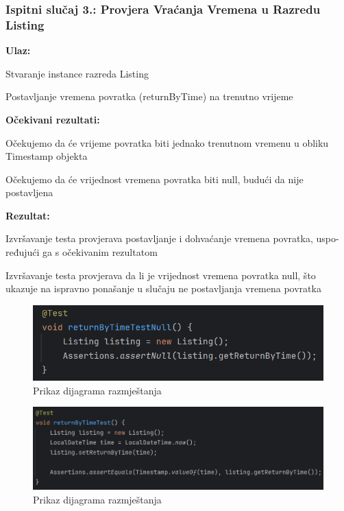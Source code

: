       

			\subsubsection{Ispitni slučaj 3.: Provjera Vraćanja Vremena u Razredu Listing}
					\noindent\textbf{Ulaz:}
					\begin{packed_item}
						\item Stvaranje instance razreda Listing
						\item Postavljanje vremena povratka (returnByTime) na trenutno vrijeme
					\end{packed_item}
					
					\noindent\textbf{Očekivani rezultati:}
					\begin{packed_item}
						\item Očekujemo da će vrijeme povratka biti jednako trenutnom vremenu u obliku Timestamp objekta
						\item Očekujemo da će vrijednost vremena povratka biti null, budući da nije postavljena
					\end{packed_item}
					 \noindent\textbf{Rezultat:}
					\begin{packed_item}
						\item  Izvršavanje testa provjerava postavljanje i dohvaćanje vremena povratka, uspo- ređujući ga s očekivanim rezultatom
						\item  Izvršavanje testa provjerava da li je vrijednost vremena povratka null, što ukazuje na ispravno ponašanje u slučaju ne postavljanja vremena povratka
					\end{packed_item}
					
					 \begin{figure} [H]
						\centering
						\includegraphics[width=0.7\linewidth]{slike/ListingTest.png}
						\caption{Prikaz dijagrama razmještanja}
						\label{fig:Prikaz dijagrama razmještanja}
					\end{figure}
					 \begin{figure} [H]
						\centering
						\includegraphics[width=0.7\linewidth]{slike/ListingTest1.png}
						\caption{Prikaz dijagrama razmještanja}
						\label{fig:Prikaz dijagrama razmještanja}
					\end{figure}


